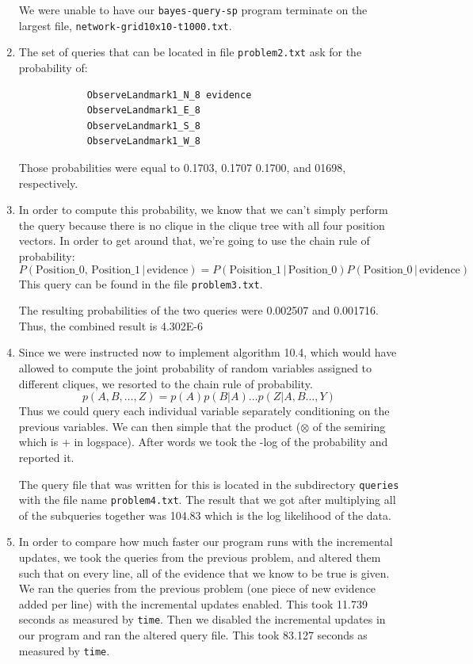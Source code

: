 \documentclass[11pt,a4paper]{article}
\begin{document}
\begin{enumerate}
		We were unable to have our {\tt bayes-query-sp} program terminate on the largest file,
		{\tt network-grid10x10-t1000.txt}.
		
		\item The set of queries that can be located in file {\tt problem2.txt} ask for the probability
		of:
		\begin{verbatim}
		    ObserveLandmark1_N_8 evidence
		    ObserveLandmark1_E_8
		    ObserveLandmark1_S_8
		    ObserveLandmark1_W_8
		\end{verbatim}
		Those probabilities were equal to 0.1703, 0.1707 0.1700, and 01698, respectively. 

		\item In order to compute this probability, we know that we can't simply perform
		the query because there is no clique in the clique tree with all four position vectors.
		In order to get around that, we're going to use the chain rule of probability:
		\[P(\textrm{Position\_0, Position\_1} \,|\, \textrm{evidence}) = 
		P(\textrm{Poisition\_1} \,|\, \textrm{Position\_0})P(\textrm{Position\_0} \,|\, \textrm{evidence})\]	
		This query can be found in the file {\tt problem3.txt}.
		
		The resulting probabilities of the two queries were 0.002507 and 0.001716. Thus, the
		combined result is 4.302E-6
		
		\item Since we were instructed now to implement algorithm 10.4, which would have allowed to compute the joint probability of random variables assigned to different cliques, we resorted to the chain rule of probability. 
		$$
		p(A,B,\ldots,Z) = p(A)p(B|A)\ldots p(Z|A,B\ldots,Y)
		$$
		Thus we could query each individual variable separately conditioning on the previous 
		variables. We can then simple that the product ($\otimes$ of the semiring which is + 
		in logspace). After words we took the -log of the probability and reported it. 
		
		The query file that was written for this is located in the subdirectory {\tt queries}
		with the file name {\tt problem4.txt}. The result that we got after multiplying all of
		the subqueries together was 104.83 which is the log likelihood of the data.
		
		\item In order to compare how much faster our program runs with the incremental
		updates, we took the queries from the previous problem, and altered them such that
		on every line, all of the evidence that we know to be true is given. We ran the queries
		from the previous problem (one piece of new evidence added per line) with the 
		incremental updates enabled. This took 11.739 seconds as measured by {\tt time}.
		Then we disabled the incremental updates in our program and ran the altered
		query file. This took 83.127 seconds as measured by {\tt time}. 
		

\end{enumerate}
\end{document}
